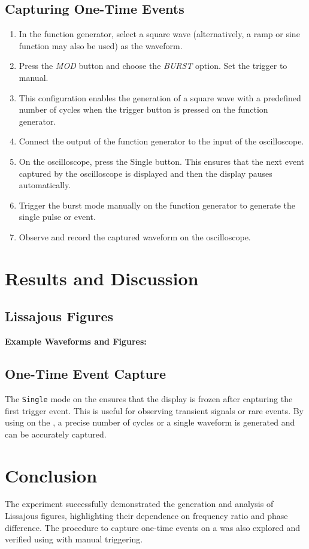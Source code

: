 \documentclass[a4paper,12pt]{article}
\begin{document}
\subsection*{Capturing One-Time Events}
\begin{enumerate}
    \item In the function generator, select a square wave (alternatively, a ramp or sine function may also be used) as the waveform.
    \item Press the \textit{MOD} button and choose the \textit{BURST} option. Set the trigger to manual.
    \item This configuration enables the generation of a square wave with a predefined number of cycles when the trigger button is pressed on the function generator.
    \item Connect the output of the function generator to the input of the oscilloscope.
    \item On the oscilloscope, press the Single button. This ensures that the next event captured by the oscilloscope is displayed and then the display pauses automatically.
    \item Trigger the burst mode manually on the function generator to generate the single pulse or event.
    \item Observe and record the captured waveform on the oscilloscope.
\end{enumerate}
\section*{Results and Discussion}
\subsection*{Lissajous Figures}
\vspace{1em}
\textbf{Example Waveforms and Figures:}



\noindent{}

\subsection*{One-Time Event Capture}
The \texttt{Single} mode on the  ensures that the display is frozen after capturing the first trigger event. This is useful for observing transient signals or rare events. By using  on the , a precise number of cycles or a single waveform is generated and can be accurately captured.

\section*{Conclusion}
The experiment successfully demonstrated the generation and analysis of Lissajous figures, highlighting their dependence on frequency ratio and phase difference. The procedure to capture one-time events on a  was also explored and verified using  with manual triggering.
\end{document}
